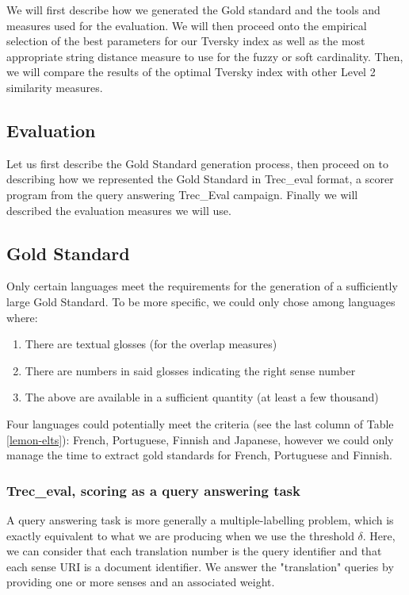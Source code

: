\documentclass[10pt,a4paper,twoside]{article}
\begin{document}
We will first describe how we generated the Gold standard and the tools and measures used for the evaluation. We will then proceed onto the empirical selection of the best parameters for our Tversky index as well as the most appropriate string distance measure to use for the fuzzy or soft cardinality. Then, we will compare the results of the optimal Tversky index with other Level 2 similarity measures.
 
\subsection{Evaluation}
Let us first describe the Gold Standard generation process, then proceed on to describing how we represented the Gold Standard in Trec\_eval format, a scorer program from the query answering Trec\_Eval campaign. Finally we will described the evaluation measures we will use. 
\subsection{Gold Standard}
Only certain languages meet the requirements for the generation of a sufficiently large Gold Standard. To be more specific, we could only chose among languages where:
\begin{enumerate}
	\item There are textual glosses (for the overlap measures)
	\item There are numbers in said glosses indicating the right sense number
	\item The above are available in a sufficient quantity (at least a few thousand)
\end{enumerate}

Four languages could potentially meet the criteria (see the last column of Table \ref{lemon-elts}): French, Portuguese, Finnish and Japanese, however we could only manage the time to extract gold standards for French, Portuguese and Finnish.

\subsubsection{Trec\_eval, scoring as a query answering task}

A query answering task is more generally a multiple-labelling problem, which is exactly equivalent to what we are producing when we use the threshold \(\delta\). Here, we can consider that each translation number is the query identifier and that each sense URI is a document identifier. We answer the "translation" queries by providing one or more senses and an associated weight.
\end{document}
